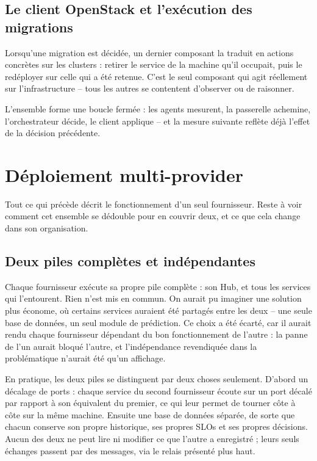 \subsection{Le client OpenStack et l'exécution des migrations}
Lorsqu'une migration est décidée, un dernier composant la traduit en actions concrètes sur les clusters : retirer le service de la machine qu'il occupait, puis le redéployer sur celle qui a été retenue. C'est le seul composant qui agit réellement sur l'infrastructure -- tous les autres se contentent d'observer ou de raisonner.

L'ensemble forme une boucle fermée : les agents mesurent, la passerelle achemine, l'orchestrateur décide, le client applique -- et la mesure suivante reflète déjà l'effet de la décision précédente.

\section{Déploiement multi-provider}
\label{sec:multi-provider}

Tout ce qui précède décrit le fonctionnement d'un seul fournisseur. Reste à voir comment cet ensemble se dédouble pour en couvrir deux, et ce que cela change dans son organisation.

\subsection{Deux piles complètes et indépendantes}
Chaque fournisseur exécute sa propre pile complète : son Hub, et tous les services qui l'entourent. Rien n'est mis en commun. On aurait pu imaginer une solution plus économe, où certains services auraient été partagés entre les deux -- une seule base de données, un seul module de prédiction. Ce choix a été écarté, car il aurait rendu chaque fournisseur dépendant du bon fonctionnement de l'autre : la panne de l'un aurait bloqué l'autre, et l'indépendance revendiquée dans la problématique n'aurait été qu'un affichage.

En pratique, les deux piles se distinguent par deux choses seulement. D'abord un décalage de ports : chaque service du second fournisseur écoute sur un port décalé par rapport à son équivalent du premier, ce qui leur permet de tourner côte à côte sur la même machine. Ensuite une base de données séparée, de sorte que chacun conserve son propre historique, ses propres SLOs et ses propres décisions. Aucun des deux ne peut lire ni modifier ce que l'autre a enregistré ; leurs seuls échanges passent par des messages, via le relais présenté plus haut.

